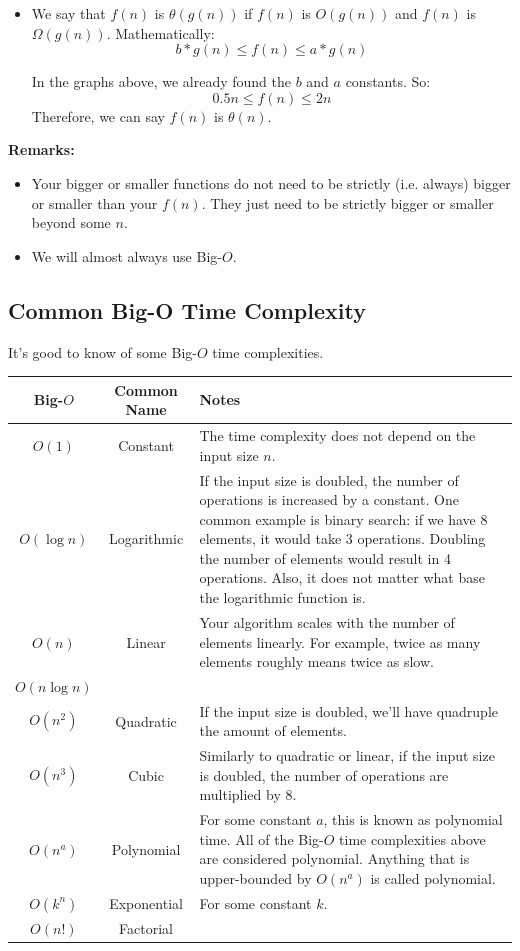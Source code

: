 \documentclass[letterpaper]{article}
\begin{document}
\begin{itemize}
    \item We say that $f(n)$ is $\theta(g(n))$ if $f(n)$ is $O(g(n))$ and $f(n)$ is $\Omega(g(n))$. Mathematically: 
    \[b * g(n) \leq f(n) \leq a * g(n)\]
    
    In the graphs above, we already found the $b$ and $a$ constants. So:
    \[0.5n \leq f(n) \leq 2n\]
    Therefore, we can say $f(n)$ is $\theta(n)$.
\end{itemize}

\textbf{Remarks:} 
\begin{itemize}
    \item Your bigger or smaller functions do not need to be strictly (i.e. always) bigger or smaller than your $f(n)$. They just need to be strictly bigger or smaller beyond some $n$.
    \item We will almost always use Big-$O$. 
\end{itemize}

\subsection{Common Big-O Time Complexity}
It's good to know of some Big-$O$ time complexities.
\begin{center}
    \begin{tabular}{c|c|p{7cm}}
        Big-$O$ & Common Name & Notes \\ 
        \hline 
        $O(1)$ & Constant & The time complexity does not depend on the input size $n$. \\ 
        $O(\log n)$ & Logarithmic & If the input size is doubled, the number of operations is increased by a constant. One common example is binary search: if we have 8 elements, it would take 3 operations. Doubling the number of elements would result in 4 operations. Also, it does not matter what base the logarithmic function is. \\ 
        $O(n)$ & Linear & Your algorithm scales with the number of elements linearly. For example, twice as many elements roughly means twice as slow. \\ 
        $O(n \log n)$ & & \\ 
        $O(n^2)$ & Quadratic & If the input size is doubled, we'll have quadruple the amount of elements. \\ 
        $O(n^3)$ & Cubic & Similarly to quadratic or linear, if the input size is doubled, the number of operations are multiplied by 8. \\ 
        $O(n^a)$ & Polynomial & For some constant $a$, this is known as polynomial time. All of the Big-$O$ time complexities above are considered polynomial. Anything that is upper-bounded by $O(n^a)$ is called polynomial. \\ 
        $O(k^n)$ & Exponential & For some constant $k$. \\ 
        $O(n!)$ & Factorial &  
    \end{tabular}
\end{center}
\end{document}
